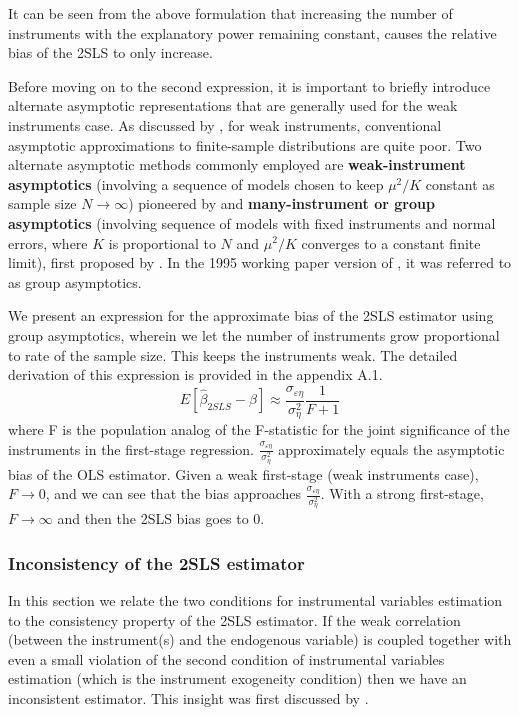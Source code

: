\par It can be seen from the above formulation that increasing the number of instruments with the explanatory power remaining constant, causes the relative bias of the 2SLS to only increase.

\par Before moving on to the second expression, it is important to briefly introduce alternate asymptotic representations that are generally used for the weak instruments case.
As discussed by \cite{stock2002survey}, for weak instruments, conventional asymptotic approximations to finite-sample distributions are quite poor. Two alternate asymptotic methods commonly employed are \textbf {weak-instrument asymptotics} (involving a sequence of models chosen to keep $\mu^2/K$ constant as sample size $N \rightarrow \infty$) pioneered by \cite{staiger1997stock} and \textbf {many-instrument or group asymptotics} (involving sequence of models with fixed instruments and normal errors, where $K$ is proportional to $N$ and $\mu^2/K$ converges to a constant finite limit), first proposed by \cite{bekker1994alternative}. In the 1995 working paper version of \cite{angrist1999jackknife}, it was referred to as group asymptotics.

\par We present an expression for the approximate bias of the 2SLS estimator using group asymptotics, wherein we let
the number of instruments grow proportional to rate of the sample size.
This keeps the instruments weak. The detailed derivation of this expression is provided in the appendix A.1.
\begin{equation}
    E[\hat{\beta }_{2SLS}-\beta]\approx \frac{\sigma_{\varepsilon\eta }}{\sigma_{\eta }^{2}}\frac{1}{F+1}
\end{equation}
where F is the population analog of the F-statistic for the joint significance of the instruments in the first-stage regression. $\frac{\sigma_{\varepsilon\eta }}{\sigma_{\eta }^{2}}$ approximately equals the asymptotic bias of the OLS estimator. Given a weak first-stage (weak instruments case), $F\rightarrow0$, and we can see that the bias approaches $ \frac{\sigma_{\varepsilon\eta }}{\sigma_{\eta }^{2}}$. With a strong first-stage, $F\rightarrow \infty$ and then the 2SLS bias goes to 0. 
 


\subsubsection{Inconsistency of the 2SLS estimator}
In this section we relate the two conditions for instrumental variables estimation to the consistency property of the 2SLS estimator. If the weak correlation (between the instrument(s) and the endogenous variable) is coupled together with even a small violation of the second condition of instrumental variables estimation (which is the instrument exogeneity condition) then we have an inconsistent estimator. This insight was first discussed by \cite{bound1995problems}.




